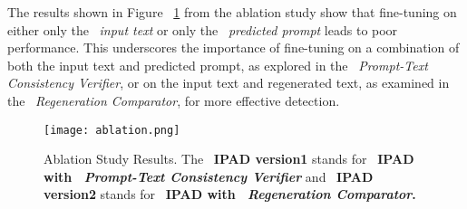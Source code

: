 The results shown in Figure ~\ref{fig:ablation} from the ablation study show that fine-tuning on either only the ~\textit{input text} or only the ~\textit{predicted prompt} leads to poor performance. This underscores the importance of fine-tuning on a combination of both the input text and predicted prompt, as explored in the ~\textit{Prompt-Text Consistency Verifier}, or on the input text and regenerated text, as examined in the ~\textit{Regeneration Comparator}, for more effective detection.
\begin{figure}[t]
  \centering
  \texttt{[image: ablation.png]}
  \caption{Ablation Study Results. The ~\textbf{IPAD version1} stands for ~\textbf{IPAD with ~\textit{Prompt-Text Consistency Verifier}} and ~\textbf{IPAD version2} stands for ~\textbf{IPAD with ~\textit{Regeneration Comparator}.}}
  \label{fig:ablation}
\end{figure}
\vspace{-0.3cm}
